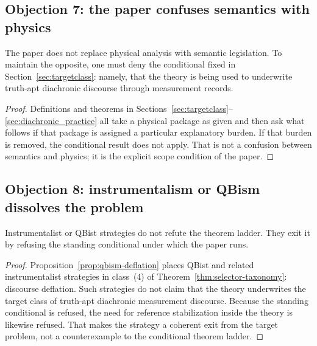 \subsection{Objection 7: the paper confuses semantics with physics}

\begin{proposition}
\label{prop:not-confusing-semantics-and-physics}
The paper does not replace physical analysis with semantic legislation. To maintain the opposite, one
must deny the conditional fixed in Section~\ref{sec:targetclass}: namely, that the theory is being used
to underwrite truth-apt diachronic discourse through measurement records.
\end{proposition}

\begin{proof}
Definitions and theorems in Sections~\ref{sec:targetclass}--\ref{sec:diachronic_practice} all take a
physical package as given and then ask what follows if that package is assigned a particular
explanatory burden. If that burden is removed, the conditional result does not apply. That is not a
confusion between semantics and physics; it is the explicit scope condition of the paper.
\end{proof}

\subsection{Objection 8: instrumentalism or QBism dissolves the problem}

\begin{proposition}
\label{prop:deflation-exit}
Instrumentalist or QBist strategies do not refute the theorem ladder. They exit it by refusing the
standing conditional under which the paper runs.
\end{proposition}

\begin{proof}
Proposition~\ref{prop:qbism-deflation} places QBist and related instrumentalist strategies in class~(4)
of Theorem~\ref{thm:selector-taxonomy}: discourse deflation. Such strategies do not claim that the
theory underwrites the target class of truth-apt diachronic measurement discourse. Because the
standing conditional is refused, the need for reference stabilization inside the theory is likewise
refused. That makes the strategy a coherent exit from the target problem, not a counterexample to the
conditional theorem ladder.
\end{proof}

